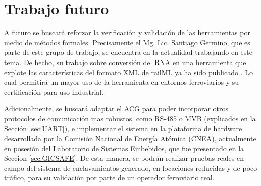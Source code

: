 \section{Trabajo futuro}

A futuro se buscará reforzar la verificación y validación de las herramientas por medio de métodos formales. Precisamente el Mg. Lic. Santiago Germino, que es parte de este grupo de trabajo, se encuentra en la actualidad trabajando en este tema. De hecho, su trabajo sobre conversión del RNA en una herramienta que explote las características del formato XML de railML ya ha sido publicado \cite{Paper_207}. Lo cual permitirá un mayor uso de la herramienta en entornos ferroviarios y su certificación para uso industrial.

Adicionalmente, se buscará adaptar el ACG para poder incorporar otros protocolos de comunicación mas robustos, como RS-485 o MVB (explicados en la Sección \ref{sec:UART}), e implementar el sistema en la plataforma de hardware desarrollada por la Comisión Nacional de Energía Atómica (CNEA), actualmente en posesión del Laboratorio de Sistemas Embebidos, que fue presentado en la Seccion \ref{sec:GICSAFE}. De esta manera, se podrán realizar pruebas reales en campo del sistema de enclavamientos generado, en locaciones reducidas y de poco tráfico, para su validación por parte de un operador ferroviario real.



